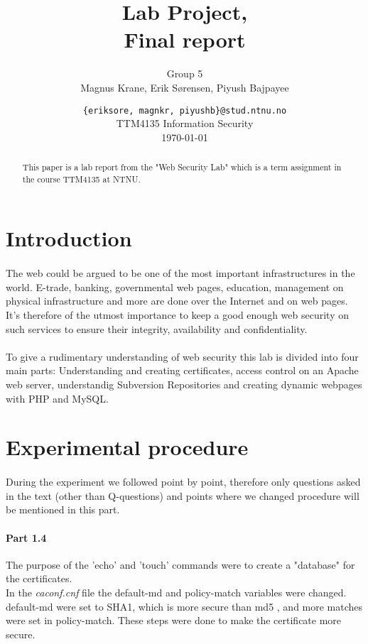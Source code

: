 \documentclass[a4paper,11pt]{article}
\title{Lab Project,\\Final report}
\author{Group 5 \\Magnus Krane, Erik S\o rensen, Piyush Bajpayee}
\date{ {\tt \{eriksore, magnkr, piyushb\}@stud.ntnu.no}\\
TTM4135 Information Security\\
\today}
\begin{document}
\maketitle
\vspace{3cm}
\begin{abstract}
This paper is a lab report from the "Web Security Lab" which is a term assignment in the course TTM4135 at NTNU. 
\end{abstract}
\section{Introduction}
\paragraph{}The web could be argued to be one of the most important infrastructures in the world. E-trade, banking, governmental web pages, education, management on physical infrastructure and more are done over the Internet and on web pages.
It's therefore of the utmost importance to keep a good enough web security on such services to ensure their integrity, availability and confidentiality. 
\paragraph{}To give a rudimentary understanding of web security this lab is divided into four main parts: Understanding and creating certificates, access control on an Apache web server, understandig Subversion Repositories and creating dynamic webpages with PHP and MySQL.
\section{Experimental procedure}
\paragraph{}During the experiment we followed \cite{1} point by point, therefore only questions asked in the text (other than Q-questions) and points where we changed procedure will be mentioned in this part.
\paragraph{Part 1.4}The purpose of the 'echo' and 'touch' commands were to create a "database" for the certificates.\\
In the \emph{caconf.cnf} file the default-md and policy-match variables were changed. default-md were set to SHA1, which is more secure than md5 \cite{3}, and more matches were set in policy-match. These steps were done to make the certificate more secure.
\end{document}
